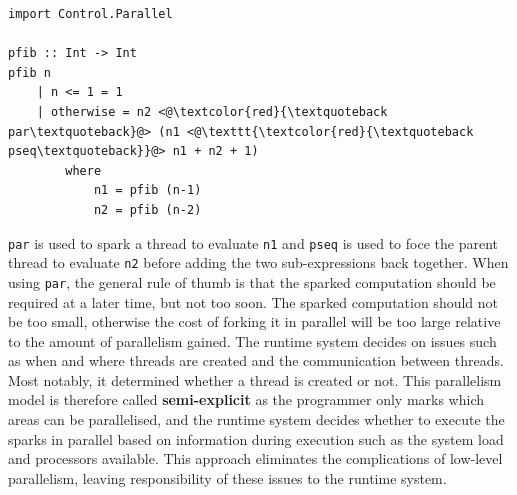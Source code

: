 \documentclass[CS4204-Notes.tex]{subfiles}
\begin{document}
\begin{lstlisting}[caption={Parallel Fibonacci}]
import Control.Parallel

pfib :: Int -> Int
pfib n 
	| n <= 1 = 1
	| otherwise	= n2 <@\textcolor{red}{\textquoteback par\textquoteback}@> (n1 <@\texttt{\textcolor{red}{\textquoteback pseq\textquoteback}}@> n1 + n2 + 1)
		where
			n1 = pfib (n-1)
			n2 = pfib (n-2)
\end{lstlisting}
\texttt{par} is used to spark a thread to evaluate \texttt{n1} and \texttt{pseq} is used to foce the parent thread to evaluate \texttt{n2} before adding the two sub-expressions back together. When using \texttt{par}, the general rule of thumb is that the sparked computation should be required at a later time, but not too soon. The sparked computation should not be too small, otherwise the cost of forking it in parallel will be too large relative to the amount of parallelism gained. The runtime system decides on issues such as when and where threads are created and the communication between threads. Most notably, it determined whether a thread is created or not. This parallelism model is therefore called \textbf{semi-explicit} as the programmer only marks which areas can be parallelised, and the runtime system decides whether to execute the sparks in parallel based on information during execution such as the system load and processors available. This approach eliminates the complications of low-level parallelism, leaving responsibility of these issues to the runtime system. 
\end{document}
